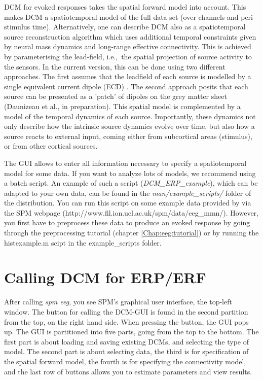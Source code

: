 DCM for evoked responses takes the spatial forward model into
account. This makes DCM a spatiotemporal model of the full data set
(over channels and peri-stimulus time). Alternatively, one can
describe DCM also as a spatiotemporal source reconstruction algorithm which uses
additional temporal constraints given by neural mass dynamics and
long-range effective connectivity. This is achieved by parameterising
the lead-field, i.e.,~the spatial projection of source 
activity to the sensors. In the current version, this can be done
using two different approaches. The first assumes that the leadfield
of each source is modelled by a single equivalent current dipole 
(ECD) \cite{sjk_dcm_erp}. The second approach posits that each source
can be presented as a 'patch' of dipoles on the grey matter sheet
(Daunizeau et al., in preparation). This spatial model is complemented
by a model of the temporal dynamics of each source. Importantly, these
dynamics not only describe how the intrinsic source dynamics evolve
over time, but also how a source reacts to external input, coming
either from subcortical areas (stimulus), or from other cortical
sources.

The GUI allows to enter all information necessary to specify a
spatiotemporal model for some data. If you want to analyze lots of
models, we recommend using a batch script. An example of such 
a script (\textit{DCM\_ERP\_example}), which can be adapted to your
own data, can be found in the \textit{man/example\_scripts/} folder of
the distribution. You can run this script on some example data provided by via the SPM webpage (http://www.fil.ion.ucl.ac.uk/spm/data/eeg\_mmn/). However, you first have to preprocess these data to produce an evoked response by going through the preprocessing tutorial (chapter \ref{Chap:eeg:tutorial}) or by running the histexample.m scipt in the example\_scripts folder.

\section{Calling DCM for ERP/ERF}
After calling \textit{spm eeg}, you see SPM's graphical user interface,
the top-left window. The button for calling the DCM-GUI is found
in the second partition from the top, on the right hand side. When
pressing the button, the GUI pops up. The GUI is partitioned into five 
parts, going from the top to the bottom. The first part is about
loading and saving existing DCMs, and selecting the type of model. The second part is about selecting
data, the third is for specification of the spatial forward model, the
fourth is for specifying the connectivity model, and the last row of
buttons allows you to estimate parameters and view results.

